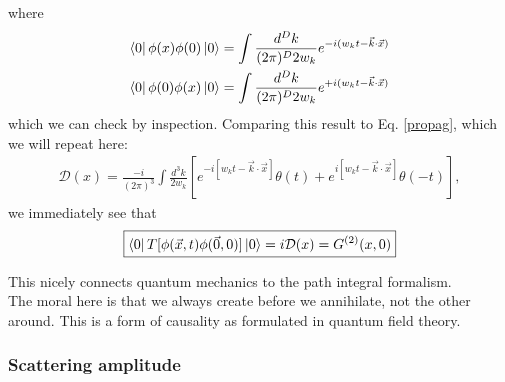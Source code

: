 \documentclass{book}
\theoremstyle{definition}
\newcommand{\f}[2]{\frac{#1}{#2}}
\newcommand{\lb}{\left[}
\newcommand{\rb}{\right]}
\newcommand{\D}{\mathcal{D}}
\begin{document}
where
\begin{align}
\bra{0} \phi(x)\phi(0) \ket{0} &= \int \f{d^D k}{(2\pi)^D 2w_k}e^{-i(w_k t - \vec{k}\cdot\vec{x})} \\ 
\bra{0} \phi(0)\phi(x) \ket{0} &= \int \f{d^D k}{(2\pi)^D 2w_k}e^{+i(w_k t - \vec{k}\cdot\vec{x})}
\end{align}
which we can check by inspection. Comparing this result to Eq. \eqref{propag}, which we will repeat here:
\begin{align}
\D(x) = \f{-i}{(2\pi)^3}\int \f{d^3k}{ 2 w_k} \lb e^{-i[w_kt - \vec{k}\cdot\vec{x}]}\theta(t) + e^{i[w_kt - \vec{k}\cdot\vec{x} ]}\theta(-t)\rb,
\end{align}
we immediately see that
\begin{align}
\boxed{\bra{0}T[\phi(\vec{x},t)\phi(\vec{0},0)]\ket{0} = i\D(x) = G^{(2)}(x,0)}
\end{align}

This nicely connects quantum mechanics to the path integral formalism. \\

The moral here is that we always create before we annihilate, not the other around. This is a form of causality as formulated in quantum field theory. 






\subsubsection{Scattering amplitude}
\end{document}
